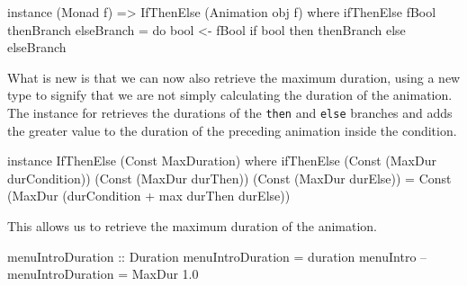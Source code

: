 \begin{code}
instance (Monad f) => IfThenElse (Animation obj f) where
  ifThenElse fBool thenBranch elseBranch = do
    bool <- fBool
    if bool then thenBranch else elseBranch
\end{code}

What is new is that we can now also retrieve the maximum duration, using a new type
 to signify that we are not simply calculating the duration of
the animation. The instance for  retrieves the
durations of the \texttt{then} and \texttt{else} branches and adds the greater
value to the duration of the preceding animation inside the condition.

\begin{code}
instance IfThenElse (Const MaxDuration) where
  ifThenElse (Const (MaxDur durCondition))
             (Const (MaxDur durThen))
             (Const (MaxDur durElse)) =
    Const (MaxDur (durCondition + max durThen durElse))
\end{code}

This allows us to retrieve the maximum duration of the  animation.

\begin{spec}
menuIntroDuration :: Duration
menuIntroDuration = duration menuIntro
-- menuIntroDuration = MaxDur 1.0
\end{spec}
